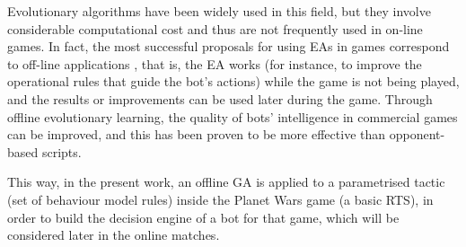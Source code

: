 \documentclass{llncs}
\begin{document}


Evolutionary algorithms have been widely used in this field, %
but they involve considerable computational cost and thus are not
frequently used in on-line games. In fact, the most successful
proposals for using EAs in games correspond to off-line applications
\cite{offline-evolutionary-learning}, that is, the EA works (for
instance, to improve the operational rules that guide the bot's
actions) while the game is not being played, and the results or
improvements can be used later during  the game. Through offline
evolutionary learning, the quality of bots' intelligence in commercial
games can be improved, and this has been proven to be more effective
than opponent-based scripts.

This way, in the present work, an offline GA is applied to a
parametrised tactic (set of behaviour model rules) inside the Planet
Wars game (a basic RTS), in order to build the decision engine of a
bot for that game, which will be considered later in the online
matches.

\end{document}
